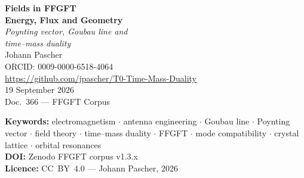 \documentclass[11pt,oneside]{book}
\begin{document}
\frontmatter
\begin{titlepage}
  \centering\vspace*{1.2cm}
  {\Large\bfseries\color{blue!70!black}
    Fields in FFGFT}\\[0.5cm]
  {\large\bfseries\color{blue!40!black}
    Energy, Flux and Geometry}\\[0.8cm]
  {\normalsize\itshape
    Poynting vector, Goubau line and\\
    time--mass duality}\\[1.5cm]
  {\large Johann Pascher}\\[0.3cm]
  {\small ORCID: 0009-0000-6518-4064}\\[0.3cm]
  {\small\url{https://github.com/jpascher/T0-Time-Mass-Duality}}\\[1.2cm]
  {\small 19 September 2026}\\[0.5cm]
  {\small Doc.~366 --- FFGFT Corpus}
\end{titlepage}

\newpage\thispagestyle{empty}
{\small\noindent
\textbf{Keywords:} electromagnetism $\cdot$
antenna engineering $\cdot$ Goubau line $\cdot$
Poynting vector $\cdot$ field theory $\cdot$
time--mass duality $\cdot$ FFGFT $\cdot$
mode compatibility $\cdot$ crystal lattice $\cdot$
orbital resonances\\[1em]
\textbf{DOI:} Zenodo FFGFT corpus v1.3.x\\[1em]
\textbf{Licence:} CC~BY~4.0 --- Johann Pascher, 2026
}

\newpage
\tableofcontents

\mainmatter
\renewcommand{\thechapter}{}
\renewcommand{\thesection}{\arabic{section}}


\end{document}

